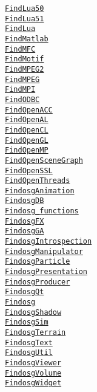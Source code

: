 \documentclass{article}
\newcommand{\cmakemodule}[1]{{\href{https://cmake.org/cmake/help/v3.13/module/#1.html}{{\lstinline{#1}}}}}
\begin{document}
\begin{minipage}[t]{0.18\linewidth}
\cmakemodule{FindLua50}\\
\cmakemodule{FindLua51}\\
\cmakemodule{FindLua}\\
\cmakemodule{FindMatlab}\\
\cmakemodule{FindMFC}\\
\cmakemodule{FindMotif}\\
\cmakemodule{FindMPEG2}\\
\cmakemodule{FindMPEG}\\
\cmakemodule{FindMPI}\\
\cmakemodule{FindODBC}\\
\cmakemodule{FindOpenACC}\\
\cmakemodule{FindOpenAL}\\
\cmakemodule{FindOpenCL}\\
\cmakemodule{FindOpenGL}\\
\cmakemodule{FindOpenMP}\\
\cmakemodule{FindOpenSceneGraph}\\
\cmakemodule{FindOpenSSL}\\
\cmakemodule{FindOpenThreads}\\
\cmakemodule{FindosgAnimation}\\
\cmakemodule{FindosgDB}\\
\cmakemodule{Findosg_functions}\\
\cmakemodule{FindosgFX}\\
\cmakemodule{FindosgGA}\\
\cmakemodule{FindosgIntrospection}\\
\cmakemodule{FindosgManipulator}\\
\cmakemodule{FindosgParticle}\\
\cmakemodule{FindosgPresentation}\\
\cmakemodule{FindosgProducer}\\
\cmakemodule{FindosgQt}\\
\cmakemodule{Findosg}\\
\cmakemodule{FindosgShadow}\\
\cmakemodule{FindosgSim}\\
\cmakemodule{FindosgTerrain}\\
\cmakemodule{FindosgText}\\
\cmakemodule{FindosgUtil}\\
\cmakemodule{FindosgViewer}\\
\cmakemodule{FindosgVolume}\\
\cmakemodule{FindosgWidget}\\

\end{minipage}
\end{document}
